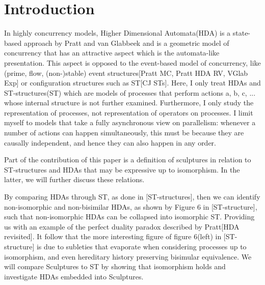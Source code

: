 \documentclass[submission,copyright,creativecommons]{eptcs}
\begin{document}
\section{Introduction}

	In highly concurrency models, Higher Dimensional Automata(HDA) is a state-based approach by Pratt and van Glabbeek and is a geometric model of concurrency that has an attractive aspect which is the automata-like presentation. This aspect is opposed to the event-based model of concurrency, like (prime, flow, (non-)stable) event structures[Pratt MC, Pratt HDA RV, VGlab Exp] or configuration structures such as ST[CJ STs]. Here, I only treat HDAs and ST-structures(ST) which are models of processes that perform actions a, b, c, ... whose internal structure is not further examined. Furthermore, I only study the representation of processes, not representation of operators on processes. I limit myself to models that take a fully asynchronous view on parallelism: whenever a number of actions can happen simultaneously, this must be because they are causally independent, and hence they can also happen in any order.


	Part of the contribution of this paper is a definition of sculptures in relation to ST-structures and HDAs that may be expressive up to isomorphism. In the latter, we will further discuss these relations.

	By comparing HDAs through ST, as done in [ST-structures], then we can identify non-isomorphic and non-bisimilar HDAs, as shown by Figure 6 in [ST-structure], such that non-isomorphic HDAs can be collapsed into isomorphic ST. Providing us with an example of the perfect duality paradox described by Pratt[HDA revisited]. It follow that the more interesting figure of figure 6(left) in [ST-structure] is due to subleties that evaporate when considering processes up to isomorphism, and even hereditary history preserving bisimular equivalence. We will compare Sculptures to ST by showing that isomorphism holds and investigate HDAs embedded into Sculptures.
\end{document}

